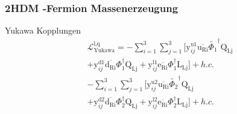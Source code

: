 \documentclass{beamer}
\begin{document}
\begin{frame}
\frametitle{2HDM -Fermion Massenerzeugung}
\begin{block}{Yukawa Kopplungen}
\begin{align*}
&\mathscr{L}_{\text{Yukawa}}^{\text{l,q}}=- \sum_{i=1}^{3} \sum_{j=1}^{3} [\text{y}^{\text{u1}}_{ij}\overline{\text{u}_{\text{Ri}}} \tilde{\Phi_{1}}^{\dagger}\text{Q}_{\text{Lj}}\\
&+\text{y}^{\text{d1}}_{ij} \overline{\text{d}_{\text{Ri}}}\Phi_{1}^{\dagger} \text{Q}_{\text{Lj}}+\text{y}^{\text{l1}}_{ij} \overline{\text{e}_{\text{Ri}}}\Phi_{1}^{\dagger} \text{L}_{\text{Lj}}]+h.c.\\
&- \sum_{i=1}^{3} \sum_{j=1}^{3} [\text{y}^{\text{u2}}_{ij}\overline{\text{u}_{\text{Ri}}} \tilde{\Phi_{2}}^{\dagger}\text{Q}_{\text{Lj}}\\
&+\text{y}^{\text{d2}}_{ij} \overline{\text{d}_{\text{Ri}}}\Phi_{2}^{\dagger} \text{Q}_{\text{Lj}}+\text{y}^{\text{l2}}_{ij} \overline{\text{e}_{\text{Ri}}}\Phi_{2}^{\dagger} \text{L}_{\text{Lj}}]+h.c.
\end{align*}
\end{block}
\end{frame}
\end{document}
